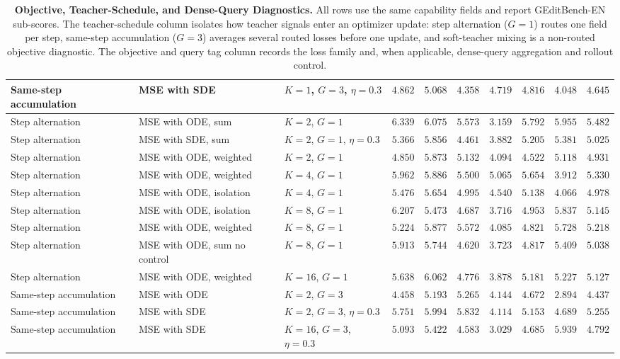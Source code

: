 \documentclass{llmxive}
\begin{document}
\begin{table}[!htbp]
{\begin{tabular}{lll|ccccccc}
    Same-step accumulation & MSE with SDE & $K{=}1$, $G{=}3$, $\eta{=}0.3$ & $4.862$ & $5.068$ & $4.358$ & $4.719$ & $4.816$ & $4.048$ & $4.645$\\
    \midrule
    Step alternation & MSE with ODE, sum & $K{=}2$, $G{=}1$ & $6.339$ & $6.075$ & $5.573$ & $3.159$ & $5.792$ & $5.955$ & $5.482$\\
    Step alternation & MSE with SDE, sum & $K{=}2$, $G{=}1$, $\eta{=}0.3$ & $5.366$ & $5.856$ & $4.461$ & $3.882$ & $5.205$ & $5.381$ & $5.025$\\
    Step alternation & MSE with ODE, weighted & $K{=}2$, $G{=}1$ & $4.850$ & $5.873$ & $5.132$ & $4.094$ & $4.522$ & $5.118$ & $4.931$\\
    Step alternation & MSE with ODE, weighted & $K{=}4$, $G{=}1$ & $5.962$ & $5.886$ & $5.500$ & $5.065$ & $5.654$ & $3.912$ & $5.330$\\
    Step alternation & MSE with ODE, isolation & $K{=}4$, $G{=}1$ & $5.476$ & $5.654$ & $4.995$ & $4.540$ & $5.138$ & $4.066$ & $4.978$\\
    Step alternation & MSE with ODE, isolation & $K{=}8$, $G{=}1$ & $6.207$ & $5.473$ & $4.687$ & $3.716$ & $4.953$ & $5.837$ & $5.145$\\
    Step alternation & MSE with ODE, weighted & $K{=}8$, $G{=}1$ & $5.224$ & $5.877$ & $5.572$ & $4.085$ & $4.821$ & $5.728$ & $5.218$\\
    Step alternation & MSE with ODE, sum no control & $K{=}8$, $G{=}1$ & $5.913$ & $5.744$ & $4.620$ & $3.723$ & $4.817$ & $5.409$ & $5.038$\\
    Step alternation & MSE with ODE, weighted & $K{=}16$, $G{=}1$ & $5.638$ & $6.062$ & $4.776$ & $3.878$ & $5.181$ & $5.227$ & $5.127$\\
    \midrule
    Same-step accumulation & MSE with ODE & $K{=}2$, $G{=}3$ & $4.458$ & $5.193$ & $5.265$ & $4.144$ & $4.672$ & $2.894$ & $4.437$\\
    Same-step accumulation & MSE with SDE & $K{=}2$, $G{=}3$, $\eta{=}0.3$ & $5.751$ & $5.994$ & $5.832$ & $4.114$ & $5.153$ & $4.689$ & $5.255$\\
    Same-step accumulation & MSE with SDE & $K{=}16$, $G{=}3$, $\eta{=}0.3$ & $5.093$ & $5.422$ & $4.583$ & $3.029$ & $4.685$ & $5.939$ & $4.792$\\
    \bottomrule
  \end{tabular}%
  }
\caption{\textbf{Objective, Teacher-Schedule, and Dense-Query Diagnostics.} All rows use the same capability fields and report GEditBench-EN sub-scores. The teacher-schedule column isolates how teacher signals enter an optimizer update: step alternation ($G{=}1$) routes one field per step, same-step accumulation ($G{=}3$) averages several routed losses before one update, and soft-teacher mixing is a non-routed objective diagnostic. The objective and query tag column records the loss family and, when applicable, dense-query aggregation and rollout control.}
\label{tab:multi-teacher-aggregation}
\end{table}
\end{document}
